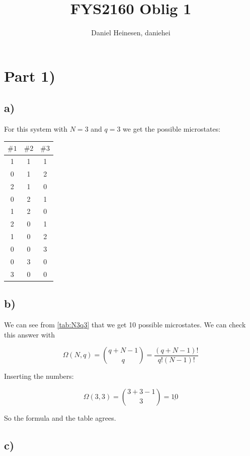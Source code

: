 \documentclass[a4paper,norsk, 10pt]{article}
\title{FYS2160 Oblig 1}
\author{Daniel Heinesen, daniehei}
\begin{document}
\maketitle


\section{Part 1)}
\subsection{a)}
For this system with $ N = 3 $ and $ q = 3 $ we get the possible microstates: 
\begin{table}[H]
\centering
\begin{tabular}{|c|c|c|}
\hline
$\#1$ & $\#2$ & $\#3$ \\
\hline
1 & 1 & 1 \\
0 & 1 & 2 \\
2 & 1 & 0 \\
0 & 2 & 1 \\
1 & 2 & 0 \\
2 & 0 & 1 \\
1 & 0 & 2 \\
0 & 0 & 3 \\
0 & 3 & 0 \\
3 & 0 & 0 \\
\hline
\end{tabular}
\end{table}\label{tab:N3q3}

\subsection{b)}
We can see from \ref{tab:N3q3} that we get 10 possible microstates. We can check this answer with

\begin{equation}
\Omega(N,q) = \binom{q + N -1}{q} = \frac{(q + N -1)!}{q!(N-1)!} 
\end{equation}\label{eq:comb}

Inserting the numbers:

\begin{equation}
\Omega(3,3) = \binom{3 + 3 -1}{3} = \underline{10}
\end{equation}

So the formula and the table agrees.

\subsection{c)}
\end{document}
